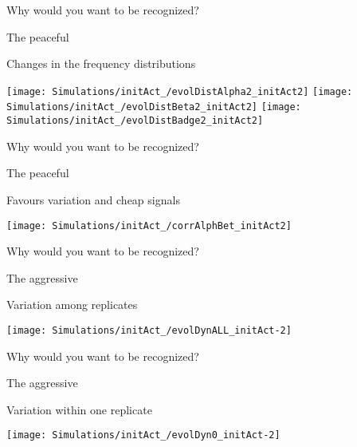 \documentclass[
  ignorenonframetext,
]{beamer}
\begin{document}
\begin{frame}{Why would you want to be recognized?}
\protect\hypertarget{why-would-you-want-to-be-recognized-3}{}

\begin{block}{The peaceful}

Changes in the frequency distributions

\begin{flushleft}\texttt{[image: Simulations/initAct\_/evolDistAlpha2\_initAct2]} \texttt{[image: Simulations/initAct\_/evolDistBeta2\_initAct2]} \texttt{[image: Simulations/initAct\_/evolDistBadge2\_initAct2]} \end{flushleft}

\end{block}

\end{frame}

\begin{frame}{Why would you want to be recognized?}
\protect\hypertarget{why-would-you-want-to-be-recognized-4}{}

\begin{block}{The peaceful}

Favours variation and cheap signals

\begin{flushleft}\texttt{[image: Simulations/initAct\_/corrAlphBet\_initAct2]} \end{flushleft}

\end{block}

\end{frame}

\begin{frame}{Why would you want to be recognized?}
\protect\hypertarget{why-would-you-want-to-be-recognized-5}{}

\begin{block}{The aggressive}

Variation among replicates

\begin{flushleft}\texttt{[image: Simulations/initAct\_/evolDynALL\_initAct-2]} \end{flushleft}

\end{block}

\end{frame}

\begin{frame}{Why would you want to be recognized?}
\protect\hypertarget{why-would-you-want-to-be-recognized-6}{}

\begin{block}{The aggressive}

Variation within one replicate

\begin{flushleft}\texttt{[image: Simulations/initAct\_/evolDyn0\_initAct-2]} \end{flushleft}

\end{block}

\end{frame}
\end{document}
